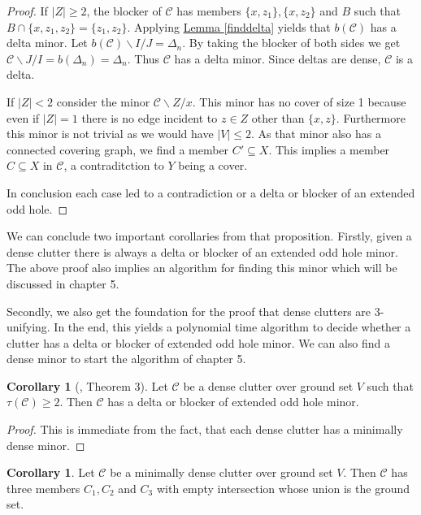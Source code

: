\documentclass[a4paper, 12pt]{scrbook}
\theoremstyle{definition}
\newtheorem{corollary}[theorem]{Corollary}
\begin{document}
\begin{proof}
       If $|Z|\geq 2$, the blocker of $\mathcal{C}$ has members $\{x,z_1\},\{x,z_2\}$ and $B$ such that $B \cap \{x,z_1,z_2\}=\{z_1,z_2\}$. Applying \hyperref[finddelta]{Lemma \ref*{finddelta}} yields that $b(\mathcal{C})$ has a delta minor. Let $b(\mathcal{C})\backslash I /J=\Delta_n$. By taking the blocker of both sides we get $\mathcal{C} \backslash J / I = b(\Delta_n)=\Delta_n$.
       Thus $\mathcal{C}$ has a delta minor. Since deltas are dense, $\mathcal{C}$ is a delta.

       If $|Z|<2$ consider the minor $\mathcal{C}\backslash Z /x$. This minor has no cover of size 1 because even if $|Z|=1$ there is no edge incident to $z \in Z$ other than $\{x,z\}$. Furthermore this minor is not trivial as we would have $|V|\leq 2$.
       As that minor also has a connected covering graph, we find a member $C' \subseteq X$. This implies a member $C \subseteq X$ in $\mathcal{C}$, a contraditction to $Y$ being a cover.

       In conclusion each case led to a contradiction or a delta or blocker of an extended odd hole.

   \end{proof}

   We can conclude two important corollaries from that proposition. Firstly, given a dense clutter there is always a delta or blocker of an extended odd hole minor. The above proof also implies an algorithm for finding this minor which will be discussed in chapter 5.

   Secondly, we also get the foundation for the proof that dense clutters are 3-unifying. In the end, this yields a polynomial time algorithm to decide whether a clutter has a delta or blocker of extended odd hole minor. We can also find a dense minor to start the algorithm of chapter 5.

   \begin{corollary}[\cite{deltas}, Theorem 3]\label{findminor}
       Let $\mathcal{C}$ be a dense clutter over ground set $V$ such that $\tau(\mathcal{C}) \geq 2$.
       Then $\mathcal{C}$ has a delta or blocker of extended odd hole minor.
   \end{corollary}

   \begin{proof}
       This is immediate from the fact, that each dense clutter has a minimally dense minor.
   \end{proof}

   \begin{corollary}\label{threemember}
       Let $\mathcal{C}$ be a minimally dense clutter over ground set $V$.
       Then $\mathcal{C}$ has three members $C_1, C_2$ and $C_3$ with empty intersection whose union is the ground set.
   \end{corollary}
\end{document}
